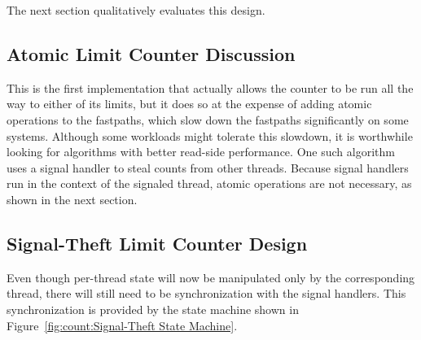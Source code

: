 \QuickQuizEnd

The next section qualitatively evaluates this design.
\ebFloatBarrier

\subsection{Atomic Limit Counter Discussion}

This is the first implementation that actually allows the counter to
be run all the way to either of its limits, but it does so at the
expense of adding atomic operations to the fastpaths, which slow down
the fastpaths significantly on some systems.
Although some workloads might tolerate this slowdown, it is worthwhile
looking for algorithms with better read-side performance.
One such algorithm uses a signal handler to steal counts from other
threads.
Because signal handlers run in the context of the signaled thread,
atomic operations are not necessary, as shown in the next section.

\QuickQuizEnd

\subsection{Signal-Theft Limit Counter Design}
\label{sec:count:Signal-Theft Limit Counter Design}

Even though per-thread state will now be manipulated only by the
corresponding thread, there will still need to be synchronization
with the signal handlers.
This synchronization is provided by the state machine shown in
Figure~\ref{fig:count:Signal-Theft State Machine}.

